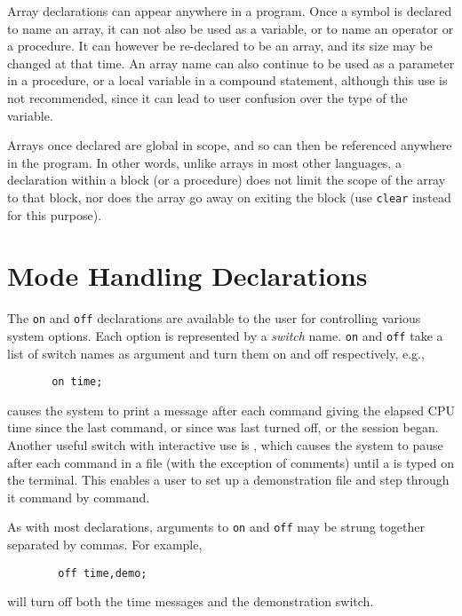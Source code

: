 Array declarations can appear anywhere in a program. Once a symbol is
declared to name an array, it can not also be used as a variable, or to
name an operator or a procedure. It can however be re-declared to be an
array, and its size may be changed at that time. An array name can also
continue to be used as a parameter in a procedure, or a local variable in
a compound statement, although this use is not recommended, since it can
lead to user confusion over the type of the variable.

Arrays once declared are global in scope, and so can then be referenced
anywhere in the program. In other words, unlike arrays in most other
languages, a declaration within a block (or a procedure) does not limit
the scope of the array to that block, nor does the array go away on
exiting the block (use \texttt{clear} instead for this purpose).

\section{Mode Handling Declarations}
\hypertarget{command:ON}{}
\hypertarget{command:OFF}{}
\hypertarget{switch:TIME}{}
\hypertarget{switch:DEMO}{}

The \texttt{on} and \texttt{off} declarations are
available to the user for controlling various system options.  Each option
is represented by a \emph{switch} name. \texttt{on} and
\texttt{off} take a list of switch names as argument and turn them on and off
respectively, e.g.,
\begin{verbatim}
       on time;
\end{verbatim}
causes the system to print a message after each command giving the elapsed
CPU time since the last command, or since  was
last turned off, or the session began.  Another useful switch with
interactive use is , which causes the system to
pause after each command in a file (with the exception of comments)
until a  is typed on the terminal.  This
enables a user to set up a demonstration file and step through it command
by command.

As with most declarations, arguments to \texttt{on} and \texttt{off} may be
strung together separated by commas.  For example,
\begin{verbatim}
        off time,demo;
\end{verbatim}
will turn off both the time messages and the demonstration switch.

